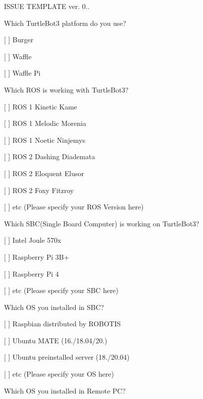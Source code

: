 I\+S\+S\+UE T\+E\+M\+P\+L\+A\+TE ver. 0..


\begin{DoxyEnumerate}
\item Which Turtle\+Bot3 platform do you use?
\begin{DoxyItemize}
\item \mbox{[} \mbox{]} Burger
\item \mbox{[} \mbox{]} Waffle
\item \mbox{[} \mbox{]} Waffle Pi
\end{DoxyItemize}
\item Which R\+OS is working with Turtle\+Bot3?
\begin{DoxyItemize}
\item \mbox{[} \mbox{]} R\+OS 1 Kinetic Kame
\item \mbox{[} \mbox{]} R\+OS 1 Melodic Morenia
\item \mbox{[} \mbox{]} R\+OS 1 Noetic Ninjemys
\item \mbox{[} \mbox{]} R\+OS 2 Dashing Diademata
\item \mbox{[} \mbox{]} R\+OS 2 Eloquent Elusor
\item \mbox{[} \mbox{]} R\+OS 2 Foxy Fitzroy
\item \mbox{[} \mbox{]} etc (Please specify your R\+OS Version here)
\end{DoxyItemize}
\item Which S\+B\+C(\+Single Board Computer) is working on Turtle\+Bot3?
\begin{DoxyItemize}
\item \mbox{[} \mbox{]} Intel Joule 570x
\item \mbox{[} \mbox{]} Raspberry Pi 3B+
\item \mbox{[} \mbox{]} Raspberry Pi 4
\item \mbox{[} \mbox{]} etc (Please specify your S\+BC here)
\end{DoxyItemize}
\item Which OS you installed in S\+BC?
\begin{DoxyItemize}
\item \mbox{[} \mbox{]} Raspbian distributed by R\+O\+B\+O\+T\+IS
\item \mbox{[} \mbox{]} Ubuntu M\+A\+TE (16./18.04/20.)
\item \mbox{[} \mbox{]} Ubuntu preinstalled server (18./20.04)
\item \mbox{[} \mbox{]} etc (Please specify your OS here)
\end{DoxyItemize}
\item Which OS you installed in Remote PC?

\end{DoxyEnumerate}
